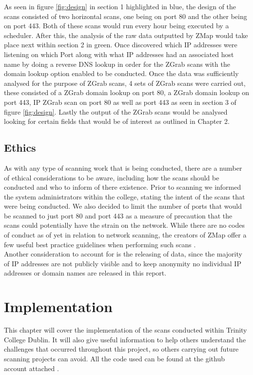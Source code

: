 \documentclass[a4wide,leqno,12pt]{report}
\begin{document}
As seen in figure \ref{fig:design} in section 1 highlighted in blue,
the design of the scans consisted of two horizontal scans, one being on port 80 and the other being on port 443. Both of these scans would run every hour being executed by a scheduler. After this, the analysis of the raw data outputted by ZMap would take place next within section 2 in green. Once discovered which IP addresses were listening on which Port along with what IP addresses had an associated host name by doing a reverse DNS lookup in order for the ZGrab scans with the domain lookup option enabled to be conducted. Once the data was sufficiently analysed for the purpose of ZGrab scans, 4 sets of ZGrab scans were carried out, these consisted of a ZGrab domain lookup on port 80, a ZGrab domain lookup on port 443, IP ZGrab scan on port 80 as well as port 443 as seen in section 3 of figure \ref{fig:design}. Lastly the output of the ZGrab scans would be analysed looking for certain fields that would be of interest as outlined in Chapter 2.

\section{Ethics}
As with any type of scanning work that is being conducted, there are a number of ethical considerations to be aware, including how the scans should be conducted and who to inform of there existence. Prior to scanning we informed the system administrators within the college, stating the intent of the scans that were being conducted. We also decided to limit the number of ports that would be scanned to just port 80 and port 443 as a measure of precaution that the scans could potentially have the strain on the network. While there are no codes of conduct as of yet in relation to network scanning, the creators of ZMap offer a few useful best practice guidelines when performing such scans\cite{durumeric2015search} \cite{durumeric2013zmap}.\\

Another consideration to account for is the releasing of data, since the majority of IP addresses are not publicly visible and to keep anonymity no individual IP addresses or domain names are released in this report.
\chapter{Implementation}
This chapter will cover the implementation of the scans conducted within Trinity College Dublin. It will also give useful information to help others understand the challenges that occurred throughout this project, so others carrying out future scanning projects can avoid. All the code used can be found at the github account attached \cite{michaelGithub}.
\end{document}
